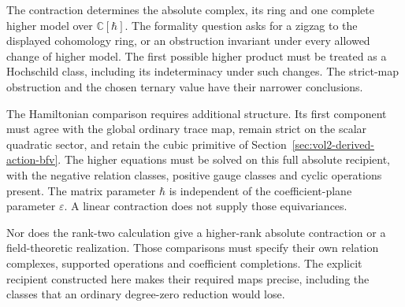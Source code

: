 The contraction determines the absolute complex, its ring
and one complete higher model over $\mathbb C[\hbar]$.
The formality question asks for a zigzag to the displayed
cohomology ring, or an obstruction invariant under every
allowed change of higher model. The first possible higher
product must be treated as a Hochschild class, including its
indeterminacy under such changes. The strict-map obstruction
and the chosen ternary value have their narrower conclusions.

The Hamiltonian comparison requires additional structure.
Its first component must agree with the global ordinary trace
map, remain strict on the scalar quadratic sector, and retain
the cubic primitive of
Section~\ref{sec:vol2-derived-action-bfv}.
The higher equations must be solved on this full absolute
recipient, with the negative relation classes, positive gauge
classes and cyclic operations present.
The matrix parameter $\hbar$ is independent of the
coefficient-plane parameter $\varepsilon$.
A linear contraction does not supply those equivariances.

Nor does the rank-two calculation give a higher-rank absolute
contraction or a field-theoretic realization.
Those comparisons must specify their own relation complexes,
supported operations and coefficient completions.
The explicit recipient constructed here makes their required
maps precise, including the classes that an ordinary
degree-zero reduction would lose.
